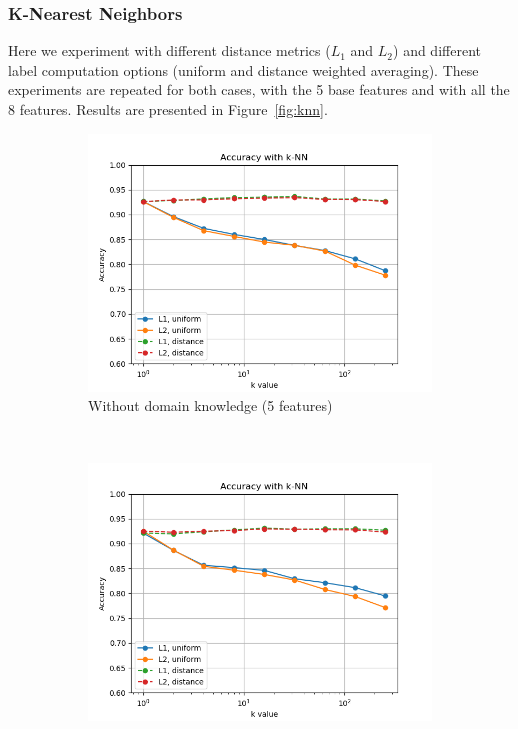 \documentclass{article}
\begin{document}
\subsubsection{K-Nearest Neighbors}
Here we experiment with different distance metrics ($L_1$ and $L_2$) and different label computation options (uniform and distance weighted averaging). These experiments are repeated for both cases, with the 5 base features and with all the 8 features. Results are presented in Figure~\ref{fig:knn}.

\begin{figure}[h!]
    \centering
    \begin{subfigure}[b]{0.45\textwidth}
        \includegraphics[width=\textwidth]{../figures/wo_domain_knowledge/accuracy_knn.png}
        \caption{Without domain knowledge (5  features)}
        \label{fig:gull}
    \end{subfigure}
    ~ %
    \begin{subfigure}[b]{0.45\textwidth}
        \includegraphics[width=\textwidth]{../figures/w_domain_knowledge/accuracy_knn.png}

\end{subfigure}
\end{figure}
\end{document}
